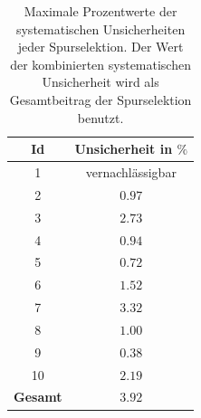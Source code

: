 \documentclass[12pt,a4paper]{report}
\begin{document}
\begin{table}[H]
\centering
\begin{tabular}{|c c|}
\hline
\textbf{Id} & \textbf{Unsicherheit in $\%$}\\
\hline
\hline
\rowcolor{mygray} 1 & vernachlässigbar\\
		  2 & $0.97$\\
\rowcolor{mygray} 3 & $2.73$\\
		  4 & $0.94$\\
\rowcolor{mygray} 5 & $0.72$\\
		  6 & $1.52$\\
\rowcolor{mygray} 7 & $3.32$\\
		  8 & $1.00$\\
\rowcolor{mygray} 9 & $0.38$\\
		  10 & $2.19$\\
\hline
\hline
\rowcolor{mygray} \textbf{Gesamt} & $3.92$\\
\hline
\end{tabular}
\caption{Maximale Prozentwerte der systematischen Unsicherheiten jeder Spurselektion. Der Wert der kombinierten systematischen Unsicherheit wird als Gesamtbeitrag der Spurselektion benutzt.}
\label{tab:SysUnsich}
\end{table}
\end{document}
